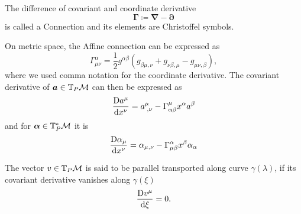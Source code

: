 \begin{definition}
    The difference of covariant and coordinate derivative
    $$\bm \Gamma\coloneqq \bm\nabla-\bm\partial$$
    is called a Connection and its elements are Christoffel symbols.
\end{definition}
On metric space, the Affine connection can be expressed as
\begin{equation}
    \Gamma^{\alpha}_{\mu\nu} = \frac{1}{2}g^{\alpha \beta}\left(g_{\beta\mu,\nu}+g_{\nu\beta,\mu}-g_{\mu\nu,\beta}\right),
\end{equation}
where we used comma notation for the coordinate derivative.
The covariant derivative of $\bm a\in \mathbb{T}_P\mathcal{M}$ can then be expressed as
\begin{equation}
    \frac{\mathrm{D} a^\mu}{\mathrm{d} x^\nu}=a_{\;,\nu}^\mu-\Gamma^\mu_{\alpha\beta} x^\alpha a^\beta 
\end{equation}
and for $\bm\alpha\in \mathbb{T}_P^*\mathcal{M}$ it is
\begin{equation}
    \frac{\mathrm{D} \alpha_\mu}{\mathrm{d} x^\nu}=\alpha_{\mu,\nu}-\Gamma^\alpha_{\mu\beta}x^\beta \alpha_\alpha 
\end{equation}

The vector $v\in \mathbb{T}_P\mathcal{M}$ is said to be parallel transported along curve $\gamma(\lambda)$, if its covariant derivative vanishes along $\gamma(\xi)$
\begin{equation}
    \frac{\mathrm{D} v^\mu}{\mathrm{d} \xi}=0.
\end{equation}

